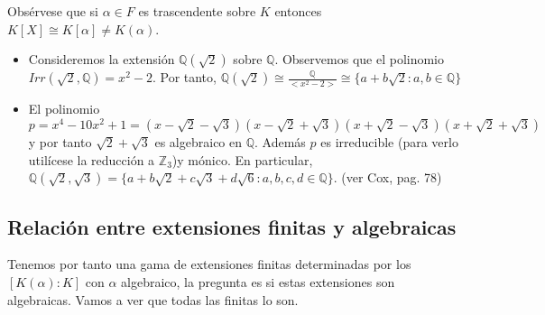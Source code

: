 Obsérvese que si $\alpha \in F$ es trascendente sobre $K$ entonces $K[X] \cong K[\alpha] \neq K(\alpha)$. 

\begin{example}
\begin{itemize}
\item Consideremos la extensión $\mathbb{Q}(\sqrt{2})$ sobre $\mathbb{Q}$. Observemos que el polinomio $Irr(\sqrt{2},\mathbb{Q}) = x^2-2$. Por tanto,  $\mathbb{Q}(\sqrt{2}) \cong \frac{\mathbb{Q}}{<x^2-2>} \cong \{a+b\sqrt{2}:a,b \in \mathbb{Q}\}$

\item El polinomio $p = x^4 - 10x^2 + 1 = (x- \sqrt{2}-\sqrt{3})(x- \sqrt{2} + \sqrt{3})(x+ \sqrt{2} - \sqrt{3})(x+\sqrt{2} + \sqrt{3})$ y por tanto $\sqrt{2}+\sqrt{3}$ es algebraico en $\mathbb{Q}$. Además $p$ es irreducible (para verlo utilícese la reducción a $\mathbb{Z}_3$)y mónico. En particular, $\mathbb{Q}(\sqrt{2},\sqrt{3}) = \{a+b\sqrt{2}+c\sqrt{3}+d\sqrt{6}:a,b,c,d \in \mathbb{Q}\}$. (ver Cox, pag. 78)
\end{itemize}
\end{example}

\subsection{Relación entre extensiones finitas y algebraicas}

Tenemos por tanto una gama de extensiones finitas determinadas por los $[K(\alpha):K]$ con $\alpha$ algebraico, la pregunta es si estas extensiones son algebraicas. Vamos a ver que todas las finitas lo son.

